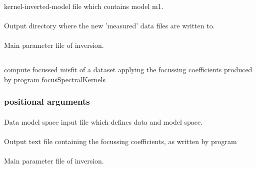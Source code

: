 \paragraph{}
kernel-inverted-model file which contains model m1.            
\paragraph{}
Output directory where the new 'measured' data files are written to.
\paragraph{}
Main parameter file of inversion. 
%
%
\subsection{} \label{programs_scripts,sec:bin_prog,sec:comp_focus_misfit}
compute focussed misfit of a dataset applying the focussing coefficients produced by program focusSpectralKernels

\subsubsection{positional arguments}
\paragraph{}
Data model space input file which defines data and model space.
\paragraph{}
Output text file containing the focussing coefficients, as written by program 
\paragraph{}
Main parameter file of inversion.
%
%
